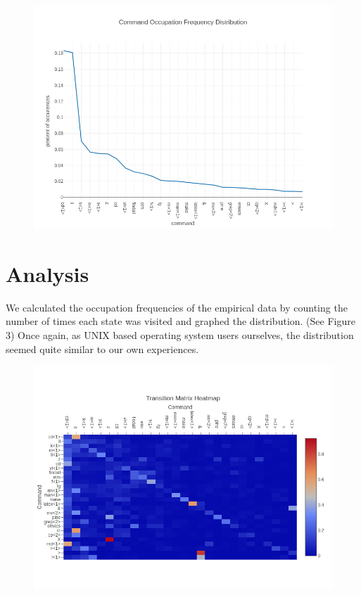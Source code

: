 \documentclass[10pt]{article}
\begin{document}
\begin{figure}[!htb]
  \centering
  \includegraphics[scale=.50]{../pictures/empirical-occ-freq-dist.png}
  \caption{}
\end{figure}
\newpage
\section{Analysis}

We calculated the occupation frequencies of the empirical data by counting the
number of times each state was visited and graphed the distribution. (See Figure
$3$) Once again, as UNIX based operating system users ourselves, the
distribution seemed quite similar to our own experiences.

\begin{figure}[!htb]
  \centering
  \includegraphics[scale=.50]{../pictures/transition-matrix-heatmap.png}
  \caption{}
\end{figure}
\end{document}
